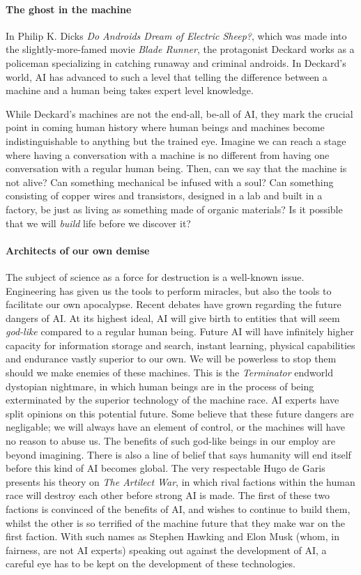 
\paragraph{The ghost in the machine}

In Philip K. Dicks \emph{Do Androids Dream of Electric Sheep?}, which was made into the slightly-more-famed movie \emph{Blade Runner}, the protagonist Deckard works as a policeman specializing in catching runaway and criminal androids. In Deckard's world, AI has advanced to such a level that telling the difference between a machine and a human being takes expert level knowledge.

While Deckard's machines are not the end-all, be-all of AI, they mark the crucial point in coming human history where human beings and machines become indistinguishable to anything but the trained eye.
Imagine we can reach a stage where having a conversation with a machine is no different from having one conversation with a regular human being.
Then, can we say that the machine is not alive?
Can something mechanical be infused with a soul?
Can something consisting of copper wires and transistors, designed in a lab and built in a factory, be just as living as something made of organic materials?
Is it possible that we will \emph{build} life before we discover it?

\paragraph{Architects of our own demise}
The subject of science as a force for destruction is a well-known issue.
Engineering has given us the tools to perform miracles, but also the tools to facilitate our own apocalypse.
Recent debates have grown regarding the future dangers of AI.
At its highest ideal, AI will give birth to entities that will seem \emph{god-like} compared to a regular human being.
Future AI will have infinitely higher capacity for information storage and search, instant learning, physical capabilities and endurance vastly superior to our own. We will be powerless to stop them should we make enemies of these machines.
This is the \emph{Terminator} endworld dystopian nightmare, in which human beings are in the process of being exterminated by the superior technology of the machine race. 
AI experts have split opinions on this potential future.
Some believe that these future dangers are negligable; we will always have an element of control, or the machines will have no reason to abuse us.
The benefits of such god-like beings in our employ are beyond imagining.
There is also a line of belief that says humanity will end itself before this kind of AI becomes global.
The very respectable Hugo de Garis presents his theory on \emph{The Artilect War}\cite{artilect}, in which rival factions within the human race will destroy each other before strong AI is made.
The first of these two factions is convinced of the benefits of AI, and wishes to continue to build them, whilst the other is so terrified of the machine future that they make war on the first faction.
With such names as Stephen Hawking and Elon Musk (whom, in fairness, are not AI experts) speaking out against the development of AI, a careful eye has to be kept on the development of these technologies.